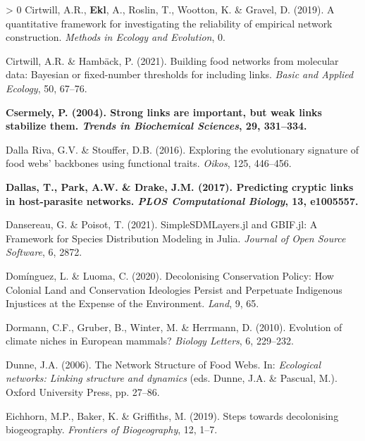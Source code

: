 \documentclass[11pt]{article}
\makeatletter
\def\maxwidth{\ifdim\Gin@nat@width>\linewidth\linewidth
\else\Gin@nat@width\fi}
\let\Oldincludegraphics\includegraphics
\renewcommand{\includegraphics}[1]{\Oldincludegraphics[width=\maxwidth]{#1}}
\newlength{\cslhangindent}
\newenvironment{CSLReferences}[3] %
 {%
  \setlength{\parindent}{0pt}
  \ifodd #1 \everypar{\setlength{\hangindent}{\cslhangindent}}\ignorespaces\fi
  \ifnum #2 > 0
  \setlength{\parskip}{#2\baselineskip}
  \fi
 }%
 {}
\providecommand{\DIFaddtex}[1]{{\bf #1}} %
\providecommand{\DIFdeltex}[1]{} %
\providecommand{\DIFaddbegin}{\protect\color{blue}} %
\providecommand{\DIFaddend}{\protect\color{black}} %
\providecommand{\DIFdelbegin}{\protect\color{red}} %
\providecommand{\DIFdelend}{\protect\color{black}} %
\providecommand{\DIFadd}[1]{\texorpdfstring{\DIFaddtex{#1}}{#1}} %
\providecommand{\DIFdel}[1]{\texorpdfstring{\DIFdeltex{#1}}{}} %
\newcommand{\DIFscaledelfig}{0.5}
\newlength{\DIFdelgraphicswidth} %
\newlength{\DIFdelgraphicsheight} %
\newcommand{\DIFaddincludegraphics}[2][]{{\color{blue}\fbox{\DIFOincludegraphics[#1]{#2}}}} %
\newcommand{\DIFdelincludegraphics}[2][]{%
\sbox{\DIFdelgraphicsbox}{\DIFOincludegraphics[#1]{#2}}%
\settoboxwidth{\DIFdelgraphicswidth}{\DIFdelgraphicsbox} %
\settoboxtotalheight{\DIFdelgraphicsheight}{\DIFdelgraphicsbox} %
\scalebox{\DIFscaledelfig}{%
\parbox[b]{\DIFdelgraphicswidth}{\usebox{\DIFdelgraphicsbox}\\[-\baselineskip] \rule{\DIFdelgraphicswidth}{0em}}\llap{\resizebox{\DIFdelgraphicswidth}{\DIFdelgraphicsheight}{%
\setlength{\unitlength}{\DIFdelgraphicswidth}%
\begin{picture}(1,1)%
\thicklines\linethickness{2pt} %
{\color[rgb]{1,0,0}\put(0,0){\framebox(1,1){}}}%
{\color[rgb]{1,0,0}\put(0,0){\line( 1,1){1}}}%
{\color[rgb]{1,0,0}\put(0,1){\line(1,-1){1}}}%
\end{picture}%
}\hspace*{3pt}}} %
} %
\DeclareRobustCommand{\DIFaddbegin}{\DIFOaddbegin \let\includegraphics\DIFaddincludegraphics} %
\DeclareRobustCommand{\DIFaddend}{\DIFOaddend \let\includegraphics\DIFOincludegraphics} %
\DeclareRobustCommand{\DIFdelbegin}{\DIFOdelbegin \let\includegraphics\DIFdelincludegraphics} %
\DeclareRobustCommand{\DIFdelend}{\DIFOaddend \let\includegraphics\DIFOincludegraphics} %
\makeatother
\begin{document}
\begin{CSLReferences}{1}{0}
\leavevmode\hypertarget{ref-Cirtwill2019QuaFra}{}%
Cirtwill, A.R., \DIFdelbegin \DIFdel{Eklf}\DIFdelend \DIFaddbegin \DIFadd{Ekl}\DIFaddend , A., Roslin, T., Wootton, K. \& Gravel, D. (2019). A
quantitative framework for investigating the reliability of empirical
network construction. \emph{Methods in Ecology and Evolution}, 0.

\leavevmode\hypertarget{ref-Cirtwill2021BuiFoo}{}%
Cirtwill, A.R. \& Hambäck, P. (2021). Building food networks from
molecular data: Bayesian or fixed-number thresholds for including links.
\emph{Basic and Applied Ecology}, 50, 67--76.

\leavevmode\DIFaddbegin \hypertarget{ref-Csermely2004StrLin}{}%
\DIFadd{Csermely, P. (2004). Strong links are important, but weak links
stabilize them. \emph{Trends in Biochemical Sciences}, 29, 331--334.
}

\leavevmode\DIFaddend \hypertarget{ref-DallaRiva2016ExpEvo}{}%
Dalla Riva, G.V. \& Stouffer, D.B. (2016). Exploring the evolutionary
signature of food webs' backbones using functional traits. \emph{Oikos},
125, 446--456.

\leavevmode\DIFaddbegin \hypertarget{ref-Dallas2017PreCry}{}%
\DIFadd{Dallas, T., Park, A.W. \& Drake, J.M. (2017). Predicting cryptic links
in host-parasite networks. \emph{PLOS Computational Biology}, 13,
e1005557.
}

\leavevmode\DIFaddend \hypertarget{ref-Dansereau2021SimJl}{}%
Dansereau, G. \& Poisot, T. (2021). SimpleSDMLayers.jl and GBIF.jl: A
Framework for Species Distribution Modeling in Julia. \emph{Journal of
Open Source Software}, 6, 2872.

\leavevmode\hypertarget{ref-Dominguez2020DecCon}{}%
Domínguez, L. \& Luoma, C. (2020). Decolonising Conservation Policy: How
Colonial Land and Conservation Ideologies Persist and Perpetuate
Indigenous Injustices at the Expense of the Environment. \emph{Land}, 9,
65.

\leavevmode\hypertarget{ref-Dormann2010EvoCli}{}%
Dormann, C.F., Gruber, B., Winter, M. \& Herrmann, D. (2010). Evolution
of climate niches in European mammals? \emph{Biology Letters}, 6,
229--232.

\leavevmode\hypertarget{ref-Dunne2006NetStr}{}%
Dunne, J.A. (2006). The Network Structure of Food Webs. In:
\emph{Ecological networks: Linking structure and dynamics} (eds. Dunne,
J.A. \& Pascual, M.). Oxford University Press, pp. 27--86.

\leavevmode\hypertarget{ref-Eichhorn2019SteDec}{}%
Eichhorn, M.P., Baker, K. \& Griffiths, M. (2019). Steps towards
decolonising biogeography. \emph{Frontiers of Biogeography}, 12, 1--7.


\end{CSLReferences}
\end{document}
